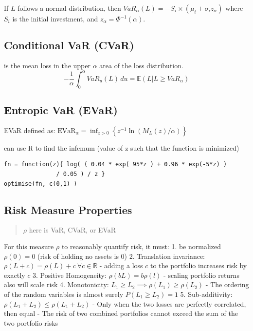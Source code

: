 \documentclass[
  oneside]{book}
\begin{document}
If \(L\) follows a normal distribution, then \(VaR_{\alpha}(L) = -S_{i} \times (\mu_{i}+\sigma_{i}z_{\alpha})\) where \(S_{i}\) is the initial investment, and \(z_{\alpha}=\Phi ^{-1}(\alpha)\).

\hypertarget{conditional-var-cvar}{%
\subsection{Conditional VaR (CVaR)}\label{conditional-var-cvar}}

is the mean loss in the upper \(\alpha\) area of the loss distribution.
\[
-\frac{1}{\alpha} \int_{0}^{\alpha} VaR_{u}(L) \, du = \mathbb{E}(L|L\geq VaR_{\alpha})
\]

\hypertarget{entropic-var-evar}{%
\subsection{Entropic VaR (EVaR)}\label{entropic-var-evar}}

EVaR defined as: \(\mathrm{EVaR}_\alpha=\inf _{z>0}\left\{z^{-1} \ln \left(M_L(z) / \alpha\right)\right\}\)

can use R to find the infemum (value of z such that the function is minimized)

\begin{verbatim}
fn = function(z){ log( ( 0.04 * exp( 95*z ) + 0.96 * exp(-5*z) )
               / 0.05 ) / z }
optimise(fn, c(0,1) )
\end{verbatim}

\hypertarget{risk-measure-properties-1}{%
\subsection{Risk Measure Properties}\label{risk-measure-properties-1}}

\begin{quote}
\(\rho\) here is VaR, CVaR, or EVaR
\end{quote}

For this measure \(\rho\) to reasonably quantify risk, it must:
1. be normalized \(\rho(0)=0\) (risk of holding no assets is 0)
2. Translation invariance: \(\rho(L+c) = \rho(L) + c \ \forall c \in \mathbb{R}\)
- adding a loss \(c\) to the portfolio increases risk by exactly \(c\)
3. Positive Homogeneity: \(\rho(bL) = b\rho(l)\)
- scaling portfolio returns also will scale risk
4. Monotonicity: \(L_{1}\geq L_{2} \implies \rho(L_{1}) \geq \rho(L_{2})\)
- The ordering of the random variables is almost surely \(P(L_{1}\geq L_{2})=1\)
5. Sub-additivity: \(\rho(L_{1}+L_{2}) \leq \rho(L_{1}+L_{2})\)
- Only when the two losses are perfectly correlated, then equal
- The risk of two combined portfolios cannot exceed the sum of the two portfolio risks
\end{document}
